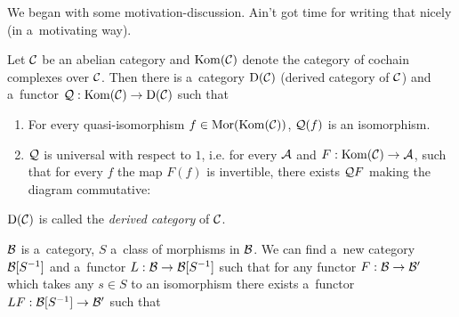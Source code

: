 




	We began with some motivation-discussion. 
	Ain't got time for writing that nicely (in a~motivating way).
	
	\begin{theorem}
		Let $\mathcal{C}$ be an abelian category and $\operatorname{Kom}(\mathcal{C})$ denote the category
		of cochain complexes over $\mathcal{C}$. 
		Then there is a~category $\operatorname{D}(\mathcal{C})$ (derived category of $\mathcal{C}$)
		and a~functor $\mathcal{Q}:\operatorname{Kom}(\mathcal{C}) \to \operatorname{D}(\mathcal{C})$
		such that
		\begin{enumerate}
			\item For every quasi-isomorphism $f \in \operatorname{Mor}(\operatorname{Kom}(\mathcal{C}))$,
			$\mathcal{Q}(f)$ is an isomorphism.
			
			\item $\mathcal{Q}$ is universal with respect to $1$, i.e.
			for every $\mathcal{A}$ and $F:\operatorname{Kom}(\mathcal{C}) \to \mathcal{A}$, such that
			for every \qi $f$ the map $F(f)$ is invertible,
			there exists $\mathcal{Q} F$ making the diagram commutative:
			

		\end{enumerate}
		
		$\operatorname{D}(\mathcal{C})$ is called the \emph{derived category} of $\mathcal{C}$.
	\end{theorem}
	
	\begin{definition}
		$\mathcal{B}$ is a~category, $S$ a~class of morphisms in $\mathcal{B}$.
		We can find a~new category $\mathcal{B}[S^{-1}]$ and a~functor
		$L:\mathcal{B} \to \mathcal{B}[S^{-1}]$ such that 
		for any functor $F: \mathcal{B} \to \mathcal{B}'$ which takes any $s \in S$
		to an isomorphism there exists a~functor $LF:\mathcal{B}[S^{-1}] \to \mathcal{B}'$
		such that
		
	\end{definition}
	
